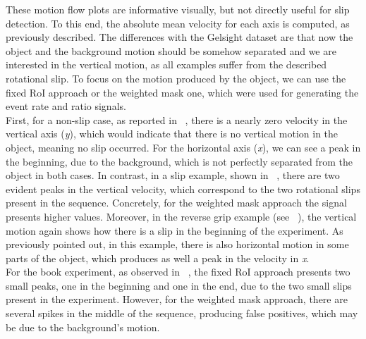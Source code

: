 These motion flow plots are informative visually, but not directly useful for slip detection. To this end, the absolute mean velocity for each axis is computed, as previously described. The differences with the Gelsight dataset are that now the object and the background motion should be somehow separated and we are interested in the vertical motion, as all examples suffer from the described rotational slip. To focus on the motion produced by the object, we can use the fixed RoI approach or the weighted mask one, which were used for generating the event rate and ratio signals.\\

First, for a non-slip case, as reported in ~, there is a nearly zero velocity in the vertical axis (\textit{y}), which would indicate that there is no vertical motion in the object, meaning no slip occurred. For the horizontal axis (\textit{x}), we can see a peak in the beginning, due to the background, which is not perfectly separated from the object in both cases. In contrast, in a slip example, shown in ~, there are two evident peaks in the vertical velocity, which correspond to the two rotational slips present in the sequence. Concretely, for the weighted mask approach the signal presents higher values. Moreover, in the reverse grip example (see ~), the vertical motion again shows how there is a slip in the beginning of the experiment. As previously pointed out, in this example, there is also horizontal motion in some parts of the object, which produces as well a peak in the velocity in \textit{x}.\\

For the book experiment, as observed in ~, the fixed RoI approach presents two small peaks, one in the beginning and one in the end, due to the two small slips present in the experiment. However, for the weighted mask approach, there are several spikes in the middle of the sequence, producing false positives, which may be due to the background's motion. 

